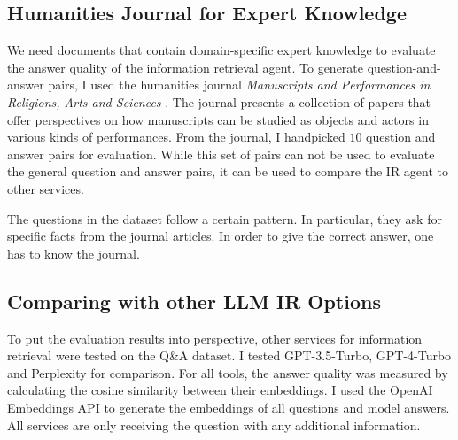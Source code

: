 \documentclass[../main.tex]{subfiles}
\begin{document}
\subsection{Humanities Journal for Expert Knowledge}


We need documents that contain domain-specific expert knowledge
to evaluate the answer quality of the information retrieval agent.
To generate question-and-answer pairs,
I used the humanities journal
\emph{Manuscripts and Performances in Religions, Arts and Sciences} \cite{Brita2023}.
The journal presents a collection of papers that offer perspectives on how
manuscripts can be studied as objects and actors in various kinds of performances.
From the journal, I handpicked $10$ question and answer pairs for evaluation.
While this set of pairs can not be used to evaluate the general question and answer pairs,
it can be used to compare the IR agent to other services.

The questions in the dataset follow a certain pattern.
In particular, they ask for specific facts from the journal articles.
In order to give the correct answer, one has to know the journal.

\subsection{Comparing with other LLM IR Options}

To put the evaluation results into perspective,
other services for information retrieval were tested on the Q\&A dataset.
I tested GPT-3.5-Turbo, GPT-4-Turbo and Perplexity for comparison.
For all tools, the answer quality was measured
by calculating the cosine similarity between their embeddings.
I used the OpenAI Embeddings API \cite{zotero-253} to generate the embeddings of all questions and model answers.
All services are only receiving the question with any additional information.
\end{document}

